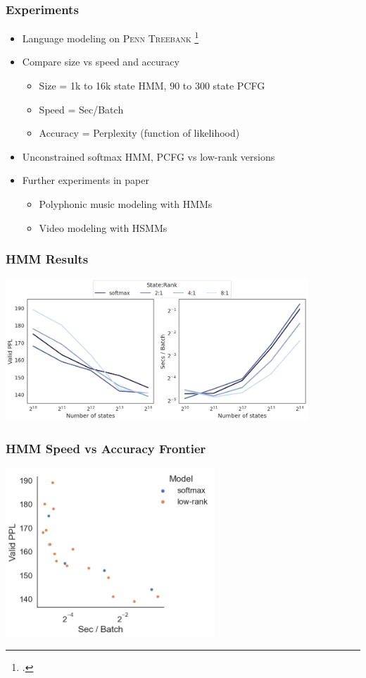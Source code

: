 \documentclass{beamer}
\begin{document}
\begin{frame}
\frametitle{Experiments}
\begin{itemize}
\item Language modeling on \textsc{Penn Treebank} \footcite{ptb}
\vspace{1em}
\item Compare size vs speed and accuracy
    \begin{itemize}
    \item Size = 1k to 16k state HMM, 90 to 300 state PCFG
    \item Speed = Sec/Batch
    \item Accuracy = Perplexity (function of likelihood)
    \end{itemize}
\vspace{1em}
\item Unconstrained softmax HMM, PCFG vs low-rank versions %
\vspace{1em}
\item Further experiments in paper
    \begin{itemize}
    \item Polyphonic music modeling with HMMs
    \item Video modeling with HSMMs
    \end{itemize}
\end{itemize}
\end{frame}

\begin{frame}
\frametitle{HMM Results}
\centering
\includegraphics[height=2.1in]{imgs/hmm/lhmm-speed-acc-joint.png}
\end{frame}

\begin{frame}
\frametitle{HMM Speed vs Accuracy Frontier}
\centering
\includegraphics[height=2.5in]{imgs/hmm/lhmm-speed-accuracy.png}
\end{frame}
\end{document}
